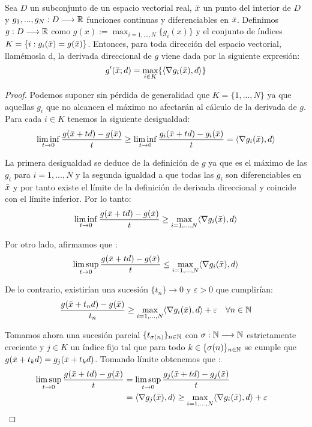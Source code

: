 	\begin{proposicionBox}\label{dirDeriv}
		Sea $ D $ un subconjunto de un espacio vectorial real, $ \bar{x} $ un punto del interior de $ D $ y $ g_1, ..., g_N : D \longrightarrow \mathbb{R} $ funciones continuas y diferenciables en $ \bar{x} $. Definimos $ g:D \longrightarrow \mathbb{R} $ como $ g(x):=\max_{i=1,...,N}\{g_i(x)\} $ y el conjunto de índices $ K = \lbrace  i : g_i(\bar{x}) =  g(\bar{x}) \rbrace $. Entonces, para toda dirección del espacio vectorial, llamémosla d, la derivada direccional de $ g $ viene dada por la siguiente expresión:
		\begin{equation}
			g'(\bar{x};d) = \max_{i \in K}\{ \langle \nabla g_i(\bar{x}), d \rangle\}
		\end{equation}
	\end{proposicionBox}
	\begin{proof}
		Podemos suponer sin pérdida de generalidad que $ K = \{1, ..., N \} $ ya que aquellas $ g_i $ que no alcancen el máximo no afectarán al cálculo de la derivada de $ g $. Para cada $ i \in K $ tenemos la siguiente desigualdad:
		\begin{equation*}
			\liminf_{t\rightarrow0}\frac{g(\bar{x}+td) - g(\bar{x})}{t} \geq \liminf_{t\rightarrow0}\frac{g_i(\bar{x}+td) - g_i(\bar{x})}{t} = \langle \nabla g_i(\bar{x}), d \rangle
		\end{equation*}
		
		La primera desigualdad se deduce de la definición de $ g $ ya que es el máximo de las $ g_i $ para $ i=1,...,N$ y la segunda igualdad a que todas las $ g_i $ son diferenciables en $ \bar{x} $ y por tanto existe el límite de la definición de derivada direccional y coincide con el límite inferior. Por lo tanto:
		\[
		\liminf_{t\rightarrow0}\frac{g(\bar{x}+td) - g(\bar{x})}{t} \geq \max_{i=1,...,N}\langle \nabla g_i(\bar{x}), d \rangle
		\]
		
		Por otro lado, afirmamos que :
		\begin{equation*}
			\limsup_{t\rightarrow0}\frac{g(\bar{x}+td) - g(\bar{x})}{t} \leq \max_{i=1,...,N}\langle \nabla g_i(\bar{x}), d \rangle
		\end{equation*}
		
		De lo contrario, existirían una sucesión $ \{t_n\}\rightarrow 0 $ y $ \varepsilon > 0 $ que cumplirían:
		\[
		\frac{g(\bar{x}+t_n d) - g(\bar{x})}{t_n} \geq \max_{i=1,...,N}\langle \nabla g_i(\bar{x}), d \rangle + \varepsilon \quad \forall n \in \mathbb{N}
		\]
		
		Tomamos ahora una sucesión parcial $ \{t_{\sigma(n)}\}_{n \in \mathbb{N}} $ con $ \sigma:\mathbb{N} \longrightarrow \mathbb{N} $ estrictamente creciente y $ j \in K $ un índice fijo tal que para todo $ k \in \{\sigma(n)\}_{n \in \mathbb{N}} $ se cumple que $ g(\bar{x} + t_k d) = g_j (\bar{x} + t_k d)$. Tomando límite obtenemos que :
		\begin{equation*}
		\begin{split}
		\limsup_{t\rightarrow0}\frac{g(\bar{x}+td) - g(\bar{x})}{t} &= 	\limsup_{t\rightarrow0}\frac{g_j(\bar{x}+td) - g_j(\bar{x})}{t} \\
		&= \langle \nabla g_j(\bar{x}), d \rangle \geq \max_{i=1,...,N}\langle \nabla g_i(\bar{x}), d \rangle + \varepsilon \quad
		\end{split}
		\end{equation*}


\end{proof}
